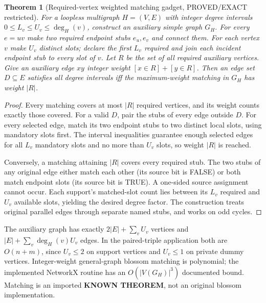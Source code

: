 \documentclass[11pt]{article}
\newtheorem{theorem}{Theorem}
\begin{document}
\begin{theorem}[Required-vertex weighted matching gadget, PROVED/EXACT restricted]
For a loopless multigraph $H=(V,E)$ with integer degree intervals $0\le L_v\le U_v\le\deg_H(v)$, construct an auxiliary \emph{simple} graph $G_H$. For every $e=uv$ make two required endpoint stubs $e_u,e_v$ and connect them. For each vertex $v$ make $U_v$ distinct slots; declare the first $L_v$ required and join each incident endpoint stub to every slot of $v$. Let $R$ be the set of all required auxiliary vertices. Give an auxiliary edge $xy$ integer weight $[x\in R]+[y\in R]$. Then an edge set $D\subseteq E$ satisfies all degree intervals iff the maximum-weight matching in $G_H$ has weight $|R|$.
\end{theorem}
\begin{proof}
Every matching covers at most $|R|$ required vertices, and its weight counts exactly those covered. For a valid $D$, pair the stubs of every edge outside $D$. For every selected edge, match its two endpoint stubs to two distinct local slots, using mandatory slots first. The interval inequalities guarantee enough selected edges for all $L_v$ mandatory slots and no more than $U_v$ slots, so weight $|R|$ is reached.

Conversely, a matching attaining $|R|$ covers every required stub. The two stubs of any original edge either match each other (its source bit is FALSE) or both match endpoint slots (its source bit is TRUE). A one-sided source assignment cannot occur. Each support's matched-slot count lies between its $L_v$ required and $U_v$ available slots, yielding the desired degree factor. The construction treats original parallel edges through separate named stubs, and works on odd cycles.
\end{proof}

The auxiliary graph has exactly $2|E|+\sum_vU_v$ vertices and $|E|+\sum_v\deg_H(v)U_v$ edges. In the paired-triple application both are $O(n+m)$, since $U_v\le2$ on support vertices and $U_v\le1$ on private dummy vertices. Integer-weight general-graph blossom matching is polynomial; the implemented NetworkX routine has an $O(|V(G_H)|^3)$ documented bound. Matching is an imported \textbf{KNOWN THEOREM}, not an original blossom implementation.
\end{document}
